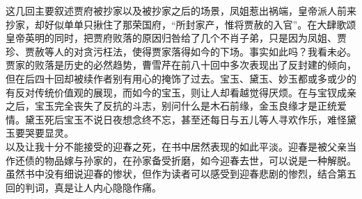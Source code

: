 %
\begin{solution}
    \large 这几回主要叙述贾府被抄家以及被抄家之后的场景，凤姐惹出祸端，皇帝派人前来抄家，却好似单单只揪住了那荣国府，“所封家产，惟将贾赦的入官”。在大肆歌颂皇帝英明的同时，把贾府败落的原因归咎给了几个不肖子弟，只是因为凤姐、贾珍、贾赦等人的对贪污枉法，使得贾家落得如今的下场。事实如此吗？我看未必。\\
    贾家的败落是历史的必然趋势，曹雪芹在前八十回中多次表现出了反封建的倾向，但在后四十回却被续作者别有用心的掩饰了过去。宝玉、黛玉、妙玉都或多或少的有反对传统价值观的展现，而如今的宝玉，则让人却看越觉得厌烦。在与宝钗成亲之后，宝玉完全丧失了反抗的斗志，别问什么是木石前缘，金玉良缘才是正统爱情。黛玉死后宝玉不说日夜想念终不忘，甚至还每日与五儿等人寻欢作乐，难怪黛玉要哭要显灵。\\
    以及让我十分不能接受的迎春之死，在书中居然表现的如此平淡。迎春是被父亲当作还债的物品嫁与孙家的，在孙家备受折磨，如今迎春去世，可以说是一种解脱。虽然书中没有细说迎春的惨状，但作为读者可以感受到迎春悲剧的惨烈，结合第五回的判词，真是让人内心隐隐作痛。
\end{solution}


%



%



%


